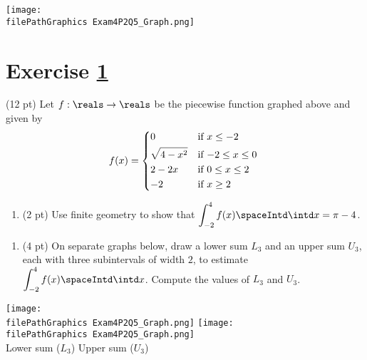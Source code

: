 %
%
%
%


\newpage

\begin{center}
\texttt{[image: \\filePathGraphics Exam4P2Q5\_Graph.png]}
\end{center}

\section{Exercise \ref{sec : Math112 Spring2022 FinalExam P2Q5}}
\label{sec : Math112 Spring2022 FinalExam P2Q5}

(12 pt) Let $f : \reals \rightarrow \reals$ be the piecewise function graphed above and given by
\begin{align*}
f(x)
=
\begin{dcases*}
0			&	if $x \leq -2$		\\
\sqrt{4 - x^{2}}	&	if $-2 \leq x \leq 0$	\\
2 - 2 x		&	if $0 \leq x \leq 2$	\\
-2			&	if $x \geq 2$
\end{dcases*}
\end{align*}

\begin{enumerate}[label=(\alph*)]
\item\label{itm : Exam4P2Q5a} (2 pt) Use finite geometry to show that $\displaystyle\int_{-2}^{4} f(x) \spaceIntd \intd x = \pi - 4$.
\end{enumerate}

\spaceSolution{1in}{%
}%



\begin{enumerate}[resume,label=(\alph*)]
\item\label{itm : Exam4P2Q5b} (4 pt) On separate graphs below, draw a lower sum $L_{3}$ and an upper sum $U_{3}$, each with three subintervals of width $2$, to estimate $\displaystyle\int_{-2}^{4} f(x) \spaceIntd \intd x$. Compute the values of $L_{3}$ and $U_{3}$.
\end{enumerate}
\begin{center}
\texttt{[image: \\filePathGraphics Exam4P2Q5\_Graph.png]}
\hspace{0.1\textwidth}
\texttt{[image: \\filePathGraphics Exam4P2Q5\_Graph.png]}
\\
Lower sum ($L_{3}$)
\hspace{0.35\textwidth}
Upper sum ($U_{3}$)
\end{center}

